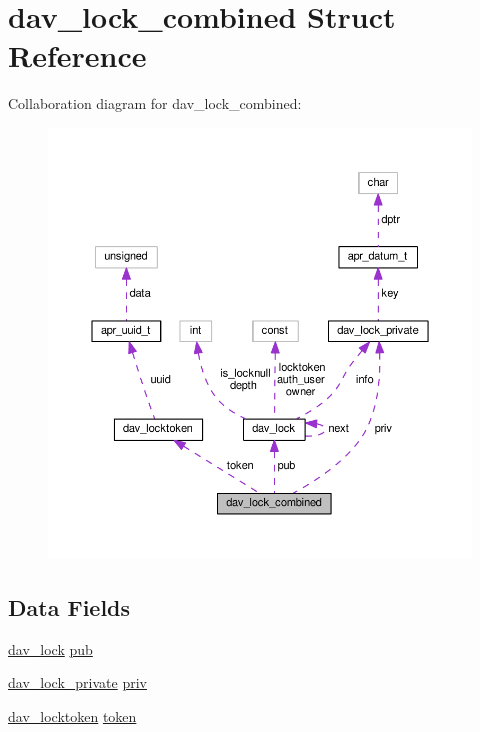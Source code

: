 \hypertarget{structdav__lock__combined}{}\section{dav\+\_\+lock\+\_\+combined Struct Reference}
\label{structdav__lock__combined}


Collaboration diagram for dav\+\_\+lock\+\_\+combined\+:
\nopagebreak
\begin{figure}[H]
\begin{center}
\leavevmode
\includegraphics[width=350pt]{structdav__lock__combined__coll__graph}
\end{center}
\end{figure}
\subsection*{Data Fields}
\begin{DoxyCompactItemize}
\item 
\hyperlink{structdav__lock}{dav\+\_\+lock} \hyperlink{structdav__lock__combined_a14f3b42977b444d08cb4518c69bed4d5}{pub}
\item 
\hyperlink{structdav__lock__private}{dav\+\_\+lock\+\_\+private} \hyperlink{structdav__lock__combined_a9c31b6b4984b2144aa3f639a542b0aed}{priv}
\item 
\hyperlink{structdav__locktoken}{dav\+\_\+locktoken} \hyperlink{structdav__lock__combined_aec1288cb93eaaa7cf487dbbf8f72163b}{token}
\end{DoxyCompactItemize}


